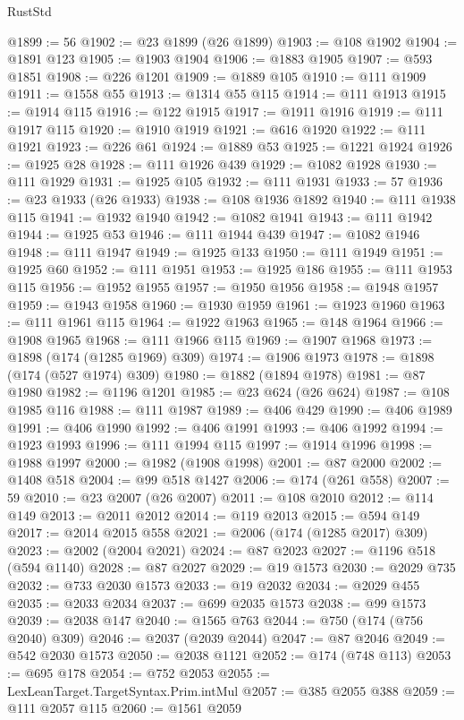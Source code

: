 \begin{lexlean}{RustStd}
\begin{coremodule}
{\begin{coremodule}
{{{{{{{{{{{{{{{{{{{{{{{{{{{{{{{{{{{{{{{{{{{{{{{{{{{{{{{{{{{{{{{{{{{{{{{{{{{{{{@1899 := 56
@1902 := @23 @1899 (@26 @1899)
@1903 := @108 @1902
@1904 := @1891 @123
@1905 := @1903 @1904
@1906 := @1883 @1905
@1907 := @593 @1851
@1908 := @226 @1201
@1909 := @1889 @105
@1910 := @111 @1909
@1911 := @1558 @55
@1913 := @1314 @55 @115
@1914 := @111 @1913
@1915 := @1914 @115
@1916 := @122 @1915
@1917 := @1911 @1916
@1919 := @111 @1917 @115
@1920 := @1910 @1919
@1921 := @616 @1920
@1922 := @111 @1921
@1923 := @226 @61
@1924 := @1889 @53
@1925 := @1221 @1924
@1926 := @1925 @28
@1928 := @111 @1926 @439
@1929 := @1082 @1928
@1930 := @111 @1929
@1931 := @1925 @105
@1932 := @111 @1931
@1933 := 57
@1936 := @23 @1933 (@26 @1933)
@1938 := @108 @1936 @1892
@1940 := @111 @1938 @115
@1941 := @1932 @1940
@1942 := @1082 @1941
@1943 := @111 @1942
@1944 := @1925 @53
@1946 := @111 @1944 @439
@1947 := @1082 @1946
@1948 := @111 @1947
@1949 := @1925 @133
@1950 := @111 @1949
@1951 := @1925 @60
@1952 := @111 @1951
@1953 := @1925 @186
@1955 := @111 @1953 @115
@1956 := @1952 @1955
@1957 := @1950 @1956
@1958 := @1948 @1957
@1959 := @1943 @1958
@1960 := @1930 @1959
@1961 := @1923 @1960
@1963 := @111 @1961 @115
@1964 := @1922 @1963
@1965 := @148 @1964
@1966 := @1908 @1965
@1968 := @111 @1966 @115
@1969 := @1907 @1968
@1973 := @1898 (@174 (@1285 @1969) @309)
@1974 := @1906 @1973
@1978 := @1898 (@174 (@527 @1974) @309)
@1980 := @1882 (@1894 @1978)
@1981 := @87 @1980
@1982 := @1196 @1201
@1985 := @23 @624 (@26 @624)
@1987 := @108 @1985 @116
@1988 := @111 @1987
@1989 := @406 @429
@1990 := @406 @1989
@1991 := @406 @1990
@1992 := @406 @1991
@1993 := @406 @1992
@1994 := @1923 @1993
@1996 := @111 @1994 @115
@1997 := @1914 @1996
@1998 := @1988 @1997
@2000 := @1982 (@1908 @1998)
@2001 := @87 @2000
@2002 := @1408 @518
@2004 := @99 @518 @1427
@2006 := @174 (@261 @558)
@2007 := 59
@2010 := @23 @2007 (@26 @2007)
@2011 := @108 @2010
@2012 := @114 @149
@2013 := @2011 @2012
@2014 := @119 @2013
@2015 := @594 @149
@2017 := @2014 @2015 @558
@2021 := @2006 (@174 (@1285 @2017) @309)
@2023 := @2002 (@2004 @2021)
@2024 := @87 @2023
@2027 := @1196 @518 (@594 @1140)
@2028 := @87 @2027
@2029 := @19 @1573
@2030 := @2029 @735
@2032 := @733 @2030 @1573
@2033 := @19 @2032
@2034 := @2029 @455
@2035 := @2033 @2034
@2037 := @699 @2035 @1573
@2038 := @99 @1573
@2039 := @2038 @147
@2040 := @1565 @763
@2044 := @750 (@174 (@756 @2040) @309)
@2046 := @2037 (@2039 @2044)
@2047 := @87 @2046
@2049 := @542 @2030 @1573
@2050 := @2038 @1121
@2052 := @174 (@748 @113)
@2053 := @695 @178
@2054 := @752 @2053
@2055 := LexLeanTarget.TargetSyntax.Prim.intMul
@2057 := @385 @2055 @388
@2059 := @111 @2057 @115
@2060 := @1561 @2059
}}}}}}}}}}}}}}}}}}}}}}}}}}}}}}}}}}}}}}}}}}}}}}}}}}}}}}}}}}}}}}}}}}}}}}}}}}}}}}
\end{coremodule}}
\end{coremodule}
\end{lexlean}
